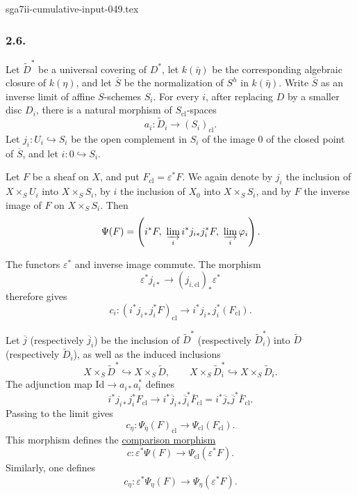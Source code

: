 \begin{filecontents*}{sga7ii-cumulative-input-049.tex}
\subsubsection*{2.6.}
Let $\widetilde D^*$ be a universal covering of $D^*$, let
$k(\bar\eta)$ be the corresponding algebraic closure of $k(\eta)$,
and let $\overline S$ be the normalization of $S^h$ in
$k(\bar\eta)$.  Write $\overline S$ as an inverse limit of affine
$S$-schemes $S_i$.  For every $i$, after replacing $D$ by a smaller
disc $D_i$, there is a natural morphism of $S_{\mathrm{cl}}$-spaces
\[
a_i:\widetilde D_i\longrightarrow(S_i)_{\mathrm{cl}}.
\]
Let $j_i:U_i\hookrightarrow S_i$ be the open complement in $S_i$ of
the image $0$ of the closed point of $\overline S$, and let
$i:0\hookrightarrow S_i$.

Let $F$ be a sheaf on $X$, and put $F_{\mathrm{cl}}=\varepsilon^*F$.
We again denote by $j_i$ the inclusion of $X\times_SU_i$ into
$X\times_SS_i$, by $i$ the inclusion of $X_0$ into
$X\times_SS_i$, and by $F$ the inverse image of $F$ on
$X\times_SS_i$.  Then
\[
\Psi(F)=
\left(i^*F,\ \varinjlim_i i^*j_{i*}j_i^*F,\
\varinjlim_i\varphi_i\right).
\]

The functors $\varepsilon^*$ and inverse image commute.  The morphism
\[
\varepsilon^*j_{i*}\longrightarrow(j_{i,\mathrm{cl}})_*\varepsilon^*
\]
therefore gives
\[
c_i:
(i^*j_{i*}j_i^*F)_{\mathrm{cl}}
\longrightarrow i^*j_{i*}j_i^*(F_{\mathrm{cl}}).
\]

Let $\overline j$ (respectively $\overline j_i$) be the inclusion of
$\widetilde D^*$ (respectively $\widetilde D_i^*$) into
$\widetilde D$ (respectively $\widetilde D_i$), as well as the
induced inclusions
\[
X\times_S\widetilde D^*\hookrightarrow X\times_S\widetilde D,
\qquad
X\times_S\widetilde D_i^*\hookrightarrow X\times_S\widetilde D_i.
\]
The adjunction map $\mathrm{Id}\longrightarrow a_{i*}a_i^*$ defines
\[
i^*j_{i*}j_i^*F_{\mathrm{cl}}
\longrightarrow
i^*\overline j_{i*}\overline j_i^*\overline F_{\mathrm{cl}}
=i^*\overline j_*\overline j^*\overline F_{\mathrm{cl}}.
\]
Passing to the limit gives
\[
c_\eta:\Psi_{\bar\eta}(F)_{\mathrm{cl}}
\longrightarrow\Psi_{\mathrm{cl}}(F_{\mathrm{cl}}).
\]
This morphism defines the \underline{comparison morphism}
\begin{equation}\tag{2.6.1}
c:\varepsilon^*\Psi(F)
\longrightarrow\Psi_{\mathrm{cl}}(\varepsilon^*F).
\end{equation}
Similarly, one defines
\begin{equation}\tag{2.6.2}
c_\eta:\varepsilon^*\Psi_\eta(F)
\longrightarrow\Psi_\eta(\varepsilon^*F).
\end{equation}

\end{filecontents*}
